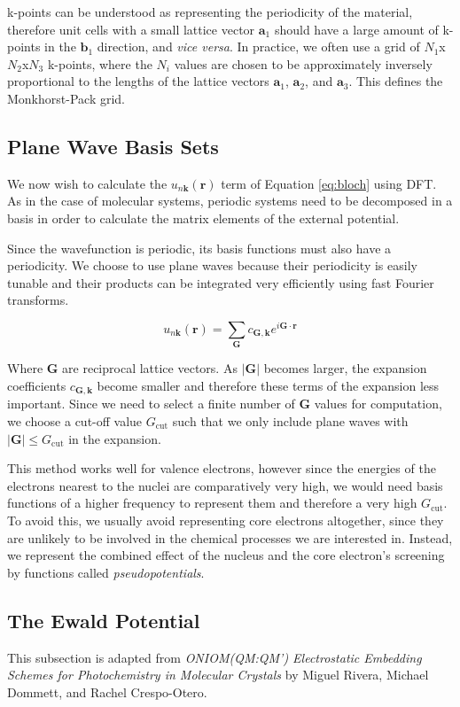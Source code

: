 k-points can be understood as representing the periodicity of the material, therefore unit cells with a small lattice vector $\bm{a}_1$ should have a large amount of k-points in the $\bm{b}_1$ direction, and \textit{vice versa}. In practice, we often use a grid of $N_1$x$N_2$x$N_3$ k-points, where the $N_i$ values are chosen to be approximately inversely proportional to the lengths of the lattice vectors $\bm{a}_1$, $\bm{a}_2$, and $\bm{a}_3$. This defines the Monkhorst-Pack grid.\cite{Monkhorst1976}

\subsection{Plane Wave Basis Sets}
We now wish to calculate the $u_{n\bm{k}}(\bm{r})$ term of Equation \ref{eq:bloch} using DFT. As in the case of molecular systems, periodic systems need to be decomposed in a basis in order to calculate the matrix elements of the external potential.

Since the wavefunction is periodic, its basis functions must also have a periodicity. We choose to use plane waves because their periodicity is easily tunable and their products can be integrated very efficiently using fast Fourier transforms.

\begin{equation}
    u_{n\bm{k}}(\bm{r}) = \sum_{\bm{G}} c_{\bm{G},\bm{k}} e^{i\bm{G}\cdot \bm{r}}
\end{equation}

Where $\bm{G}$ are reciprocal lattice vectors. As $|\bm{G}|$ becomes larger, the expansion coefficients $c_{\bm{G},\bm{k}}$ become smaller and therefore these terms of the expansion less important. Since we need to select a finite number of $\bm{G}$ values for computation, we choose a cut-off value $G_{\text{cut}}$ such that we only include plane waves with $|\bm{G}| \leq G_{\text{cut}}$ in the expansion.

This method works well for valence electrons, however since the energies of the electrons nearest to the nuclei are comparatively very high, we would need basis functions of a higher frequency to represent them and therefore a very high $G_{\text{cut}}$. To avoid this, we usually avoid representing core electrons altogether, since they are unlikely to be involved in the chemical processes we are interested in. Instead, we represent the combined effect of the nucleus and the core electron's screening by functions called \textit{pseudopotentials}.

\subsection{The Ewald Potential}
\label{sec:ewald}
This subsection is adapted from \textit{ONIOM(QM:QM') Electrostatic Embedding Schemes for Photochemistry in Molecular Crystals} by Miguel Rivera, Michael Dommett, and Rachel Crespo-Otero.\cite{Rivera2019}

